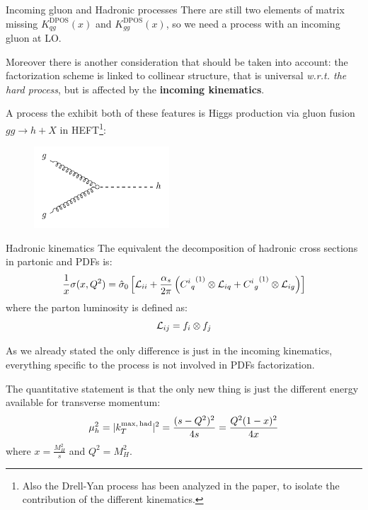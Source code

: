 \documentclass[9pt]{beamer}
\DeclareMathOperator{\dpos}{DPOS}
\begin{document}
\begin{frame}{Incoming gluon and Hadronic processes}
    \vspace*{8pt}
    There are still two elements of matrix missing $K_{qg}^{\dpos}(x)$ and
    $K_{gg}^{\dpos}(x)$, so we need a process with an incoming gluon at LO.

    \vspace*{8pt}
    Moreover there is another consideration that should be taken into account:
    the factorization scheme is linked to collinear structure, that is
    universal \textit{w.r.t. the hard process}, but is affected by the \textbf{incoming
    kinematics}.

    A process the exhibit both of these features is Higgs production via gluon
    fusion $gg\to h + X$ in HEFT\footnote{Also the Drell-Yan process has been
    analyzed in the paper, to isolate the contribution of the different kinematics.}:

    \begin{figure}
      \includegraphics[width=0.45\textwidth]{pictures/feynd/ggh}
    \end{figure}
\end{frame}

\begin{frame}{Hadronic kinematics}
    \vspace*{5pt}
    The equivalent the decomposition of hadronic cross sections in partonic and
    PDFs is:
    \begin{equation*}
        \frac{1}{x} \sigma(x,Q^2)= \hat \sigma_0 \left[  {\cal L}_{ii}
        +\frac{\alpha_s}{2\pi}\left( {{C^i}_q}^{(1)} \otimes {\cal L}_{iq} +
        {{C^i}_g}^{(1)} \otimes {\cal L}_{ig}\right) \right]
    \end{equation*}
    where the parton luminosity is defined as:
    \begin{equation*}\label{eq:lumi}
        {\cal L}_{ij}= f_i\otimes f_j
    \end{equation*}

    \vspace*{10pt}
    As we already stated the only difference is just in the incoming
    kinematics, everything specific to the process is not involved in PDFs
    factorization.

    The quantitative statement is that the only new thing is just the different
    energy available for transverse momentum:
    \begin{equation*}\label{eq:ktmaxh}
        \mu_h^2=  |k_T^{\rm max,\, had}|^2=\frac{(s-Q^2)^2}{4s}=\frac{Q^2(1-x)^2}{4x}
    \end{equation*}
    where $x=\frac{M_H^2}{s}$ and $ Q^2 = M_H^2 $.
\end{frame}
\end{document}
